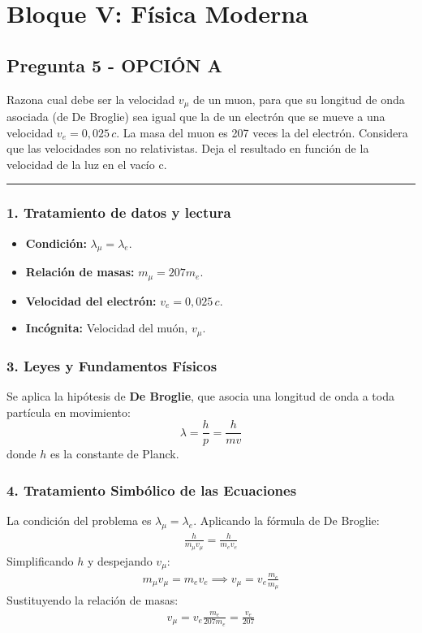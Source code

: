 \section{Bloque V: Física Moderna}
\label{sec:mod1_2018_jul_ext}
\subsection{Pregunta 5 - OPCIÓN A}
\label{subsec:5A_2018_jul_ext}
\begin{cajaenunciado}
Razona cual debe ser la velocidad $v_{\mu}$ de un muon, para que su longitud de onda asociada (de De Broglie) sea igual que la de un electrón que se mueve a una velocidad $v_{e}=0,025\,c$. La masa del muon es 207 veces la del electrón. Considera que las velocidades son no relativistas. Deja el resultado en función de la velocidad de la luz en el vacío c.
\end{cajaenunciado}
\hrule
\subsubsection*{1. Tratamiento de datos y lectura}
\begin{itemize}
    \item \textbf{Condición:} $\lambda_{\mu} = \lambda_e$.
    \item \textbf{Relación de masas:} $m_{\mu} = 207 m_e$.
    \item \textbf{Velocidad del electrón:} $v_e = 0,025\,c$.
    \item \textbf{Incógnita:} Velocidad del muón, $v_{\mu}$.
\end{itemize}
\subsubsection*{3. Leyes y Fundamentos Físicos}
Se aplica la hipótesis de \textbf{De Broglie}, que asocia una longitud de onda a toda partícula en movimiento:
$$ \lambda = \frac{h}{p} = \frac{h}{mv} $$
donde $h$ es la constante de Planck.
\subsubsection*{4. Tratamiento Simbólico de las Ecuaciones}
La condición del problema es $\lambda_{\mu} = \lambda_e$. Aplicando la fórmula de De Broglie:
\begin{gather}
    \frac{h}{m_{\mu} v_{\mu}} = \frac{h}{m_e v_e}
\end{gather}
Simplificando $h$ y despejando $v_{\mu}$:
\begin{gather}
    m_{\mu} v_{\mu} = m_e v_e \implies v_{\mu} = v_e \frac{m_e}{m_{\mu}}
\end{gather}
Sustituyendo la relación de masas:
\begin{gather}
    v_{\mu} = v_e \frac{m_e}{207 m_e} = \frac{v_e}{207}
\end{gather}
